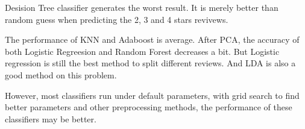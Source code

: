\documentclass[12pt]{article}
\begin{document}
\begin{figure}[H]
\captionsetup[subfigure]{labelformat=empty}
\centering
{}
\end{figure}
Desision Tree classifier generates the worst result. It is merely better than random guess when predicting the 2, 3 and 4 stars revivews.

The performance of KNN and Adaboost is average. After PCA, the accuracy of both Logistic Regreesion and Random Forest decreases a bit. But Logistic regression is still the best method to split different reviews. And LDA is also a good method on this problem. 

However, most classifiers run under default parameters, with grid search to find better parameters and other preprocessing methods, the performance of these classifiers may be better.
\end{document}
